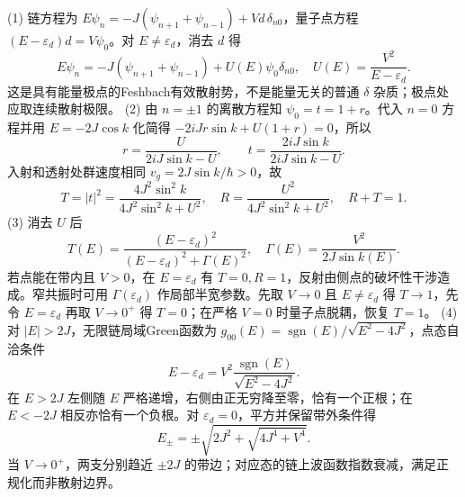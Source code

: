 (1) 链方程为 \(E\psi_n=-J(\psi_{n+1}+\psi_{n-1})+Vd\,\delta_{n0}\)，量子点方程 \((E-\varepsilon_d)d=V\psi_0\)。对 \(E\ne\varepsilon_d\)，消去 \(d\) 得
\[
E\psi_n=-J(\psi_{n+1}+\psi_{n-1})+U(E)\psi_0\delta_{n0},
\quad U(E)=\frac{V^2}{E-\varepsilon_d}.
\]
这是具有能量极点的Feshbach有效散射势，不是能量无关的普通 \(\delta\) 杂质；极点处应取连续散射极限。
(2) 由 \(n=\pm1\) 的离散方程知 \(\psi_0=t=1+r\)。代入 \(n=0\) 方程并用 \(E=-2J\cos k\) 化简得 \(-2iJr\sin k+U(1+r)=0\)，所以
\[
r=\frac{U}{2iJ\sin k-U},\qquad
t=\frac{2iJ\sin k}{2iJ\sin k-U}.
\]
入射和透射处群速度相同 \(v_g=2J\sin k/\hbar>0\)，故
\[
T=|t|^2=\frac{4J^2\sin^2k}{4J^2\sin^2k+U^2},\quad
R=\frac{U^2}{4J^2\sin^2k+U^2},\quad R+T=1.
\]
(3) 消去 \(U\) 后
\[
T(E)=\frac{(E-\varepsilon_d)^2}{(E-\varepsilon_d)^2+
\Gamma(E)^2},\quad
\Gamma(E)=\frac{V^2}{2J\sin k(E)}.
\]
若点能在带内且 \(V>0\)，在 \(E=\varepsilon_d\) 有 \(T=0,R=1\)，反射由侧点的破坏性干涉造成。窄共振时可用 \(\Gamma(\varepsilon_d)\) 作局部半宽参数。先取 \(V\to0\) 且 \(E\ne\varepsilon_d\) 得 \(T\to1\)，先令 \(E=\varepsilon_d\) 再取 \(V\to0^+\) 得 \(T=0\)；在严格 \(V=0\) 时量子点脱耦，恢复 \(T=1\)。
(4) 对 \(|E|>2J\)，无限链局域Green函数为 \(g_{00}(E)=\operatorname{sgn}(E)/\sqrt{E^2-4J^2}\)，点态自洽条件
\[
E-\varepsilon_d=V^2\frac{\operatorname{sgn}(E)}{\sqrt{E^2-4J^2}}.
\]
在 \(E>2J\) 左侧随 \(E\) 严格递增，右侧由正无穷降至零，恰有一个正根；在 \(E<-2J\) 相反亦恰有一个负根。对 \(\varepsilon_d=0\)，平方并保留带外条件得
\[
E_\pm=\pm\sqrt{2J^2+\sqrt{4J^4+V^4}}.
\]
当 \(V\to0^+\)，两支分别趋近 \(\pm2J\) 的带边；对应态的链上波函数指数衰减，满足正规化而非散射边界。
